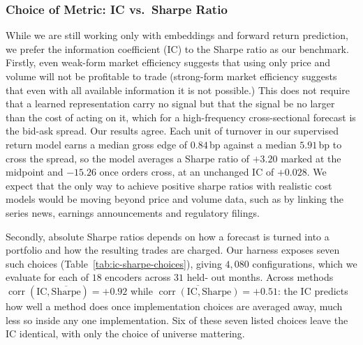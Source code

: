 \subsubsection{Choice of Metric: IC vs.\ Sharpe Ratio}
\label{sec:ic-vs-sharpe}

While we are still working only with embeddings and forward return prediction,
we prefer the information coefficient (IC) to the Sharpe ratio as our
benchmark. Firstly, even weak-form market efficiency \citep{fama1970efficient} suggests 
that using only price and volume will not be profitable to trade (strong-form market efficiency
suggests that even with all available information it is not possible.) 
This does not require that a learned representation carry no signal but that the signal be no larger than the
cost of acting on it, which for a high-frequency cross-sectional forecast is the bid-ask spread.
Our results agree. Each unit of turnover in our supervised return model earns
a median gross edge of $0.84$\,bp against a median $5.91$\,bp to cross the
spread, so the model averages a Sharpe ratio of $+3.20$ marked at the midpoint
and $-15.26$ once orders cross, at an unchanged IC of $+0.028$. We expect that the only way to achieve positive sharpe ratios with realistic cost models would be moving beyond price and volume data, such as by linking the series news, earnings announcements and regulatory filings. 



Secondly, absolute Sharpe ratios depends on how a forecast is turned into a
portfolio and how the resulting trades are charged. Our harness exposes seven
such choices (Table~\ref{tab:ic-sharpe-choices}), giving $4{,}080$
configurations, which we evaluate for each of $18$ encoders across $31$ held-
out months. Across methods $\operatorname{corr}(\mathrm{IC},
\overline{\text{Sharpe}}) = +0.92$ while
$\overline{\operatorname{corr}(\mathrm{IC}, \text{Sharpe})} = +0.51$: the IC
predicts how well a method does once implementation choices are averaged away,
much less so inside any one implementation. Six of these seven listed
choices leave the IC identical, with only the choice of universe mattering. 